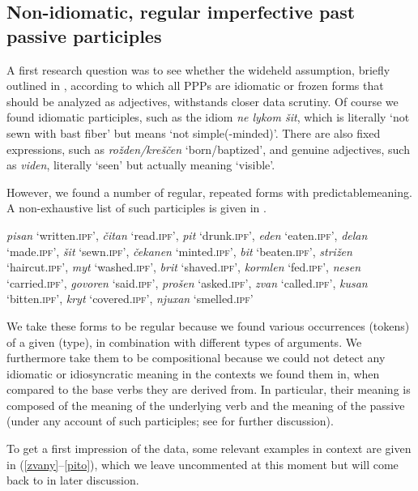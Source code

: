 \documentclass[output=paper,modfonts,newtxmath,hidelinks]{langscibook}
\begin{document}
\subsection{Non-idiomatic, regular imperfective past passive participles} 
\label{nonidiom}

A first research question was to see whether the wideheld assumption, briefly outlined in , according to which all  PPPs are idiomatic or frozen forms that should be analyzed as adjectives, withstands closer data scrutiny. Of course we found idiomatic participles, such as the idiom \textit{ne lykom šit}, which is literally `not sewn with bast fiber' but means `not simple(-minded)'. There are also fixed expressions, such as \textit{rožden/kreščen} `born/baptized', and genuine adjectives, such as \textit{viden}, literally `seen' but actually meaning `visible'.

However, we found a number of regular, repeated forms with predictable\linebreak meaning. A non-exhaustive list of such participles is given in .

\ea	\textit{pisan} `written.\textsc{ipf}', \textit{čitan} `read.\textsc{ipf}', \textit{pit} `drunk.\textsc{ipf}', \textit{eden} `eaten.\textsc{ipf}', \textit{delan} `made.\textsc{ipf}', \textit{šit} `sewn.\textsc{ipf}', \textit{čekanen} `minted.\textsc{ipf}', \textit{bit} `beaten.\textsc{ipf}', \textit{strižen} `haircut.\textsc{ipf}', \textit{myt} `washed.\textsc{ipf}', \textit{brit} `shaved.\textsc{ipf}', \textit{kormlen} `fed.\textsc{ipf}', \textit{nesen} `carried.\textsc{ipf}', \textit{govoren} `said.\textsc{ipf}', \textit{prošen} `asked.\textsc{ipf}', \textit{zvan} `called.\textsc{ipf}', \textit{kusan} `bitten.\textsc{ipf}', \textit{kryt} `covered.\textsc{ipf}', \textit{njuxan} `smelled.\textsc{ipf}' \label{list}
\z

\noindent We take these forms to be regular because we found various occurrences (tokens) of a given  (type), in combination with different types of arguments. We furthermore take them to be compositional because we could not detect any idiomatic or idiosyncratic meaning in the contexts we found them in, when compared to the base verbs they are derived from. In particular, their meaning is composed of the meaning of the underlying verb and the meaning of the  passive  (under any account of such participles; see  for further discussion). 

To get a first impression of the data, some relevant examples in context are given in (\ref{zvany}--\ref{pito}), which we leave uncommented at this moment but will come back to in later discussion. 
\end{document}
